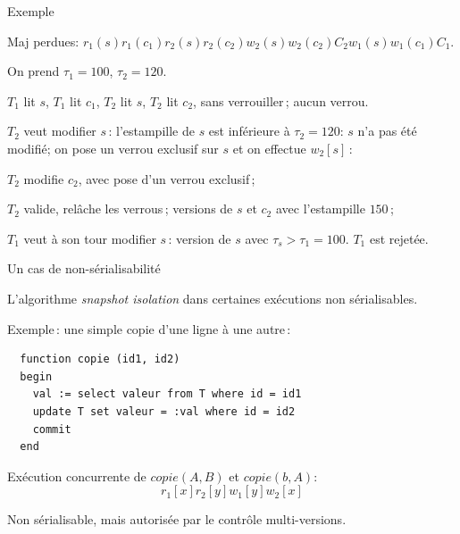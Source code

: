 \begin{frame}{Exemple}

Maj perdues:
$r_1(s)  r_1(c_1) r_2(s)  r_2(c_2)  w_2(s)  w_2(c_2) C_2 w_1(s) w_1(c_1) C_1$.

On prend
$\tau_1 = 100$,  $\tau_2 = 120$. 

\vfill
\begin{blocgauche}
\begin{redbullet}
  \item $T_1$ lit $s$, $T_1$ lit $c_1$,  $T_2$ lit $s$, $T_2$ lit $c_2$, sans verrouiller\,;
      \alert{aucun verrou}.
    
   \item $T_2$ veut modifier $s$\,: l'estampille de $s$
             est inférieure à  $\tau_2 = 120$: $s$ n'a pas été modifié; on 
             pose un verrou exclusif sur $s$ et on effectue
                 $w_2[s]$\,: 

   \item $T_2$ modifie $c_2$, avec pose d'un verrou exclusif\,;

   \item $T_2$ valide, relâche les verrous\,;
      versions de 
                $s$ et $c_2$ avec l'estampille $150$\,;

   \item $T_1$ veut à son tour modifier $s$\,: version de $s$ avec $\tau_s > \tau_1 = 100$. 
               $T_1$ est rejetée.
\end{redbullet}

\end{blocgauche}

\end{frame}


\begin{frame}[fragile]{Un cas de non-sérialisabilité}

L'algorithme \textit{snapshot isolation} dans certaines exécutions non sérialisables.

\vfill

Exemple\,: une simple copie d'une ligne à une autre\,: 
\begin{verbatim}
  function copie (id1, id2)
  begin
    val := select valeur from T where id = id1
    update T set valeur = :val where id = id2
    commit
  end
\end{verbatim}
\vfill 

Exécution concurrente de $copie(A,B)$ et $copie(b,A)$:
$$r_1[x]r_2[y]w_1[y]w_2[x]$$

\vfill

Non sérialisable, mais autorisée par le contrôle multi-versions.

\end{frame}



